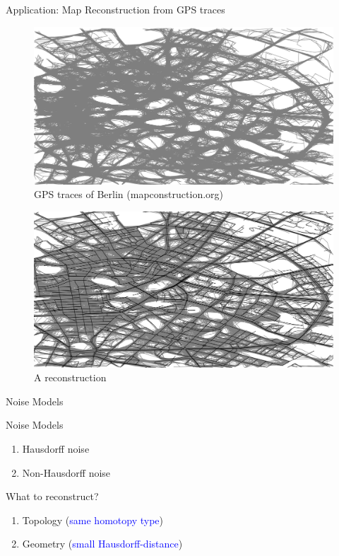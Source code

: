 \documentclass[9pt,sans-serif]{beamer}
\begin{document}
\begin{frame}{Application: Map Reconstruction from GPS traces}
  \begin{figure}[htb]
    \centering \includegraphics[scale=0.15]{Berlin}
    \caption{GPS traces of Berlin (mapconstruction.org)}
  \end{figure}
  
  \pause
  \begin{figure}[htb]
    \centering \includegraphics[scale=0.2]{Berlin_Recon}
    \caption{A reconstruction}
  \end{figure}
\end{frame}

\begin{frame}{Noise Models}
  \begin{block}{Noise Models}
    \begin{enumerate}
    \item Hausdorff noise
    \item Non-Hausdorff noise
    \end{enumerate}
  \end{block}
  
  \pause
  
  \begin{block}{What to reconstruct?}
    \begin{enumerate}
    \item Topology
      (\textcolor{blue}{same homotopy type})
    \item Geometry
      (\textcolor{blue}{small Hausdorff-distance})
    \end{enumerate}
  \end{block}
\end{frame}
\end{document}
